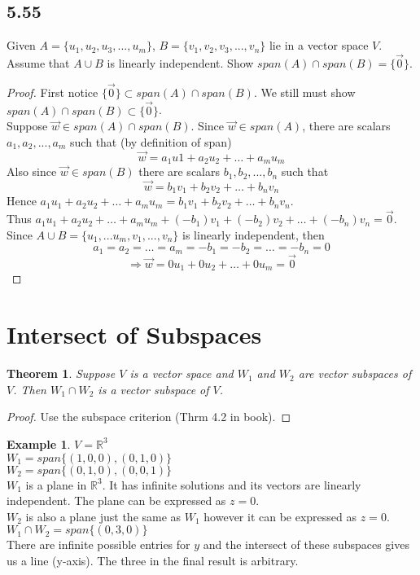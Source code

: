 \documentclass{report}
\theoremstyle{plain}
\newtheorem*{thrm}{Theorem}
\theoremstyle{definition}
\newtheorem*{ex}{Example}
\theoremstyle{plain}
\begin{document}
\subsection{5.55}
Given $A=\{u_1,u_2,u_3,...,u_m\}$, $B=\{v_1,v_2,v_3,...,v_n\}$ lie in a vector space $V$. Assume that $A\cup B$ is linearly independent. Show $span(A)\cap span(B) = \{\vec{0}\}$.
\begin{proof}
First notice $\{\vec{0}\} \subset span(A) \cap span(B)$. We still must show $span(A) \cap span(B) \subset \{\vec{0}\}$.\\
Suppose $\vec{w}\in span(A) \cap span(B)$. Since $\vec{w}\in span(A)$, there are scalars $a_1,a_2,...,a_m$ such that (by definition of span)
\[ \vec{w}=a_1u1+a_2u_2+\dots+a_mu_m \] Also since $\vec{w}\in span(B)$ there are scalars $b_1,b_2,...,b_n$ such that 
\[ \vec{w}=b_1v_1+b_2v_2+\dots+b_nv_n \]
Hence $a_1u_1+a_2u_2+\dots+a_mu_m = b_1v_1+b_2v_2+\dots+b_nv_n$.\\
Thus $a_1u_1+a_2u_2+\dots+a_mu_m+(-b_1)v_1+(-b_2)v_2+\dots+(-b_n)v_n = \vec{0}$.\\
Since $A \cup B = \{u_1,...u_m,v_1,...,v_n\}$ is linearly independent, then
\[ a_1 = a_2 = \dots = a_m = -b_1 = -b_2 = \dots = -b_n = 0 \]
\[ \Rightarrow \vec{w}=0u_1+0u_2+\dots+0u_m=\vec{0} \]
\end{proof}

\section{Intersect of Subspaces}
\begin{thrm}
Suppose $V$ is a vector space and $W_1$ and $W_2$ are vector subspaces of $V$. Then $W_1\cap W_2$ is a vector subspace of $V$.
\end{thrm}
\begin{proof}
Use the subspace criterion (Thrm 4.2 in book).
\end{proof}
\begin{ex}
$V=\mathbb{R}^3$\\
$W_1 = span\{(1,0,0),(0,1,0)\}$\\
$W_2 = span\{(0,1,0),(0,0,1)\}$\\
$W_1$ is a plane in $\mathbb{R}^3$. It has infinite solutions and its vectors are linearly independent. The plane can be expressed as $z=0$.\\
$W_2$ is also a plane just the same as $W_1$ however it can be expressed as $z=0$.\\
$W_1 \cap W_2 = span\{(0,3,0)\}$\\
There are infinite possible entries for $y$ and the intersect of these subspaces gives us a line (y-axis). The three in the final result is arbitrary.
\end{ex}
\end{document}
